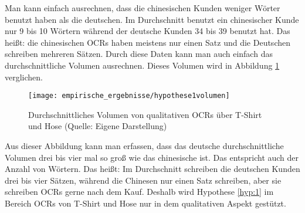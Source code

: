 Man kann einfach ausrechnen, dass die chinesischen Kunden weniger Wörter benutzt haben als die deutschen. Im Durchschnitt benutzt ein chinesischer Kunde nur 9 bis 10 Wörtern während der deutsche Kunden 34 bis 39 benutzt hat. Das heißt: die chinesischen \ac{OCRs} haben meistens nur einen Satz und die Deutschen schreiben mehreren Sätzen. Durch diese Daten kann man auch einfach das durchschnittliche Volumen ausrechnen. Dieses Volumen wird in Abbildung \ref{fig:durchschnittlichesVolumen} verglichen.
\begin{figure}[htb]
\centering
    \texttt{[image: empirische\_ergebnisse/hypothese1volumen]} 
    \caption[Durchschnittliches Volumen von qualitativen OCRs über T-Shirt und Hose]{Durchschnittliches Volumen von qualitativen \ac{OCRs} über T-Shirt und Hose (Quelle: Eigene Darstellung)}
    \label{fig:durchschnittlichesVolumen}
\end{figure}

Aus dieser Abbildung kann man erfassen, dass das deutsche durchschnittliche Volumen drei bis vier mal so groß wie das chinesische ist. Das entspricht auch der Anzahl von Wörtern. Das heißt: Im Durchschnitt schreiben die deutschen Kunden drei bis vier Sätzen, während die Chinesen nur einen Satz schreiben, aber sie schreiben \ac{OCRs} gerne nach dem Kauf. Deshalb wird Hypothese \ref{hyp:1} im Bereich \ac{OCRs} von T-Shirt und Hose nur in dem qualitativen Aspekt gestützt.
